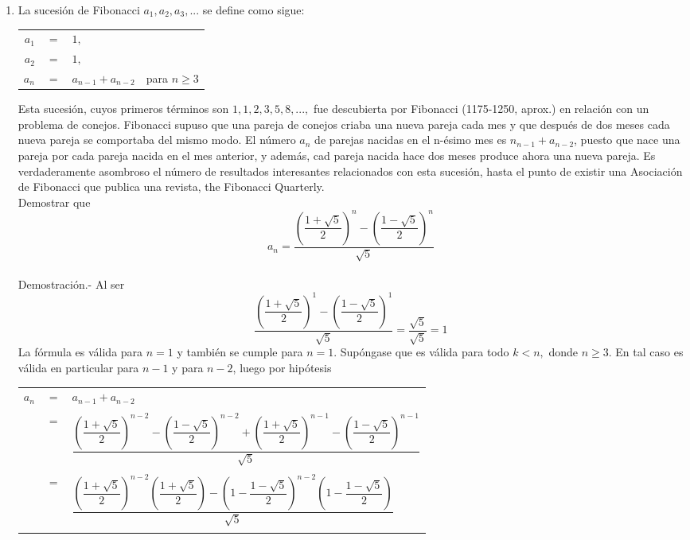 \begin{enumerate}[\bfseries 1.]
   \item La sucesión de Fibonacci $a_1,a_2,a_3,...$ se define como sigue:
      \begin{center}
	 \begin{tabular}{rcll}
	    $a_1$ & $=$ & $1,$ & \\
	    $a_2$ & $=$ & $1,$ & \\
	    $a_n$ & $=$ & $a_{n-1} + a_{n-2}$ & para $n \geq 3$\\
	 \end{tabular}
      \end{center}
      Esta sucesión, cuyos primeros términos son $1,1,2,3,5,8,...,$ fue descubierta por Fibonacci (1175-1250, aprox.) en relación con un problema de conejos. Fibonacci supuso que una pareja de conejos criaba una nueva pareja cada mes y que después de dos meses cada nueva pareja se comportaba del mismo modo. El número $a_n$ de parejas nacidas en el n-ésimo mes es $n_{n-1} + a_{n-2}$, puesto que nace una pareja por cada pareja nacida en el mes anterior, y además, cad pareja nacida hace dos meses produce ahora una nueva pareja. Es verdaderamente asombroso el número de resultados interesantes relacionados con esta sucesión, hasta el punto de existir una Asociación de Fibonacci que publica una revista, the Fibonacci Quarterly.\\
      Demostrar que $$a_n = \dfrac{\left( \dfrac{1+\sqrt{5}}{2} \right)^n - \left( \dfrac{1-\sqrt{5}}{2} \right)^n}{\sqrt{5}}$$\\
      Demostración.- \; Al ser $$\dfrac{\left( \dfrac{1+\sqrt{5}}{2} \right)^1 - \left( \dfrac{1-\sqrt{5}}{2} \right)^1}{\sqrt{5}}=\dfrac{\sqrt{5}}{\sqrt{5}}=1$$
      La fórmula es válida para $n=1$ y también se cumple para $n=1$. Supóngase que es válida para todo $k<n,$ donde $n\geq 3.$ En tal caso es válida en particular para $n-1$ y para $n-2$, luego por hipótesis
      \begin{center}
	 \begin{tabular}{rcl}
	    $a_n$ & $=$ & $a_{n-1} + a_{n-2}$\\\\
		  & $=$ & $\dfrac{\left( \dfrac{1+\sqrt{5}}{2} \right)^{n-2} - \left( \dfrac{1-\sqrt{5}}{2} \right)^{n-2} + \left( \dfrac{1+\sqrt{5}}{2} \right)^{n-1} - \left( \dfrac{1-\sqrt{5}}{2} \right)^{n-1}}{\sqrt{5}}$\\\\
		  & $=$ & $\dfrac{\left( \dfrac{1+\sqrt{5}}{2}\right)^{n-2} \left( \dfrac{1+\sqrt{5}}{2} \right) - \left( 1 - \dfrac{1-\sqrt{5}}{2} \right)^{n-2} \left( 1 - \dfrac{1- \sqrt{5}}{2} \right)}{\sqrt{5}}$\\\\

\end{tabular}
\end{center}
\end{enumerate}
